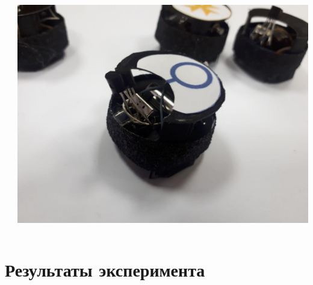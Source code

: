 \documentclass[aspectratio=169]{beamer}
\begin{document}
	\begin{frame}
		\frametitle{\insertsection}
		\framesubtitle{\insertsubsection}
		\begin{columns}
			\begin{column}{0.5\textwidth}
				
			\end{column}
			\begin{column}{0.5\textwidth}
				\begin{center}
					\includegraphics[width=\textwidth]{robot}
				\end{center}
			\end{column}
		\end{columns}
	\end{frame}

	\section{Результаты эксперимента}
	\begin{frame}
		\frametitle{\insertsection}
		
	\end{frame}
	
	
\end{document}
